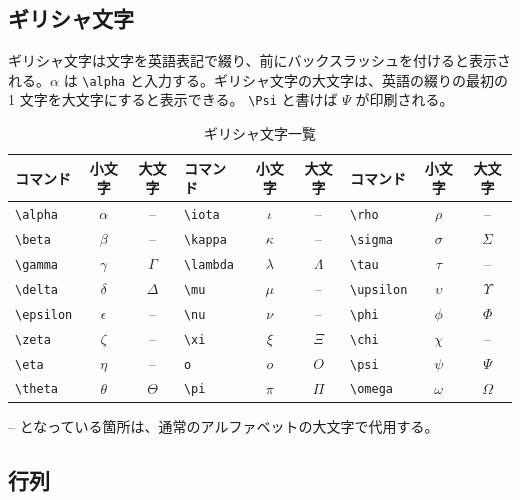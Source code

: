 \subsection{ギリシャ文字}
\label{sec:latex:greek}

ギリシャ文字は文字を英語表記で綴り、前にバックスラッシュを付けると表示される。$\alpha$ は \verb|\alpha| と入力する。ギリシャ文字の大文字は、英語の綴りの最初の 1 文字を大文字にすると表示できる。 \verb|\Psi| と書けば $\Psi$ が印刷される。
\begin{table}[H]
  \begin{center}
    \caption{ギリシャ文字一覧}
    \label{tab:greek}
    \begin{tabular}{|lcc|lcc|lcc|}
      \hline
      コマンド & 小文字 & 大文字 & コマンド & 小文字 & 大文字 & コマンド & 小文字 & 大文字 \\
      \hline \hline
      \verb|\alpha| & $\alpha$ & -- & \verb|\iota| & $\iota$ & -- & \verb|\rho| & $\rho$ & -- \\
      \verb|\beta| & $\beta$ & -- & \verb|\kappa| & $\kappa$ & -- & \verb|\sigma| & $\sigma$ & $\Sigma$ \\
      \verb|\gamma| & $\gamma$ & $\Gamma$ & \verb|\lambda| & $\lambda$ & $\Lambda$ & \verb|\tau| & $\tau$ & -- \\
      \verb|\delta| & $\delta$ & $\Delta$ & \verb|\mu| & $\mu$ & -- & \verb|\upsilon| & $\upsilon$ & $\Upsilon$ \\
      \verb|\epsilon| & $\epsilon$ & -- & \verb|\nu| & $\nu$ & -- & \verb|\phi| & $\phi$ & $\Phi$ \\
      \verb|\zeta| & $\zeta$ & -- & \verb|\xi| & $\xi$ & $\Xi$ & \verb|\chi| & $\chi$ & -- \\
      \verb|\eta| & $\eta$ & -- & \verb|o| & $o$ & $O$ & \verb|\psi| & $\psi$ & $\Psi$ \\
      \verb|\theta| & $\theta$ & $\Theta$ & \verb|\pi| & $\pi$ & $\Pi$ & \verb|\omega| & $\omega$ & $\Omega$ \\
      \hline
    \end{tabular}
  \end{center}
\end{table} \noindent
-- となっている箇所は、通常のアルファベットの大文字で代用する。

\subsection{行列}
\label{sec:latex:matrix}

